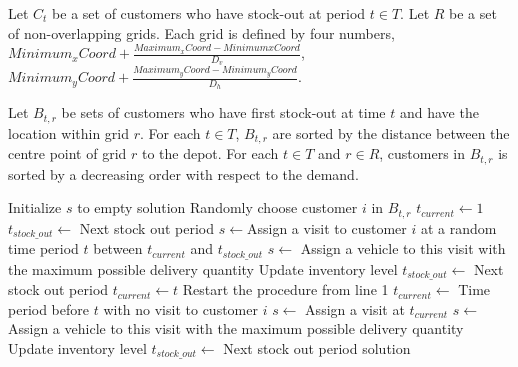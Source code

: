 \documentclass{article}
\begin{document}
Let $C_t$ be a set of customers who have stock-out at period $t\in T$. Let $R$ be a set of non-overlapping grids. Each grid is defined by four numbers, $Minimum_xCoord + \frac{Maximum_xCoord-MinimumxCoord}{D_v}$, $Minimum_yCoord +\frac{Maximum_yCoord-Minimum_yCoord}{D_h}$.


Let $B_{t,r}$ be sets of customers who have first stock-out at time $t$ and have the location within grid $r$. For each $t\in T$, $B_{t,r}$ are sorted by the distance between the centre point of grid $r$ to the depot. For each $t\in T$ and $r\in R$, customers in $B_{t,r}$ is sorted by a decreasing order with respect to the demand.



\begin{algorithm}[H]
\caption{\textbf{Construct initial schedule}}
\begin{algorithmic}[1]
\STATE Initialize $s$ to empty solution
\REPEAT
\STATE Randomly choose customer $i$ in $B_{t,r}$
\STATE $t_{current}\gets 1$ 
\STATE $t_{stock\_out} \gets$ Next stock out period
\REPEAT
\STATE $s\gets $Assign a visit to customer $i$ at a random time period $t$ between $t_{current}$ and $t_{stock\_out}$
\STATE $s\gets $ Assign a vehicle to this visit with the maximum possible delivery quantity
\STATE Update inventory level  
\STATE $t_{stock\_out}\gets$ Next stock out period
\STATE $t_{current}\gets t$
        \STATE Restart the procedure from line 1
    \ELSE
        \STATE $t_{current}\gets$ Time period before $t$ with no visit to customer $i$ 
        \STATE $s\gets$ Assign a visit at $t_{current}$
        \STATE $s\gets $ Assign a vehicle to this visit with the maximum possible delivery quantity
        \STATE Update inventory level  
        \STATE $t_{stock\_out}\gets$ Next stock out period
    \ENDIF
\ENDIF
{}
\RETURN solution 
\end{algorithmic}
\end{algorithm}
\end{document}
